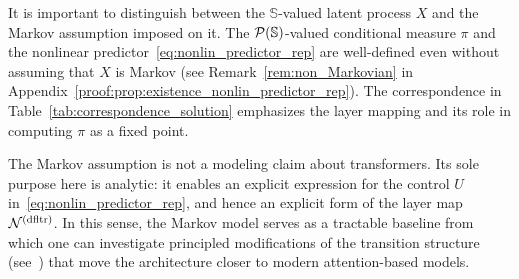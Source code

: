\documentclass[twoside,11pt]{article}
\def\clP{{\cal P}}
\def\bS{\begin{slide}}
\def\clP{{\cal P}}
\def\clP{{\cal P}}
\def\bS{\mathbb{S}}
\def\dfltr{{\text{\rm (dfltr)}}}
\begin{document}
It is important to distinguish between the $\bS$-valued latent
process $X$ and the Markov assumption imposed on it. The
$\clP(\bS)$-valued conditional measure $\pi$ and the nonlinear
predictor~\eqref{eq:nonlin_predictor_rep} are well-defined even
without assuming that $X$ is Markov (see
Remark~\ref{rem:non_Markovian} in
Appendix~\ref{proof:prop:existence_nonlin_predictor_rep}). The
correspondence in Table~\ref{tab:correspondence_solution} emphasizes
the layer mapping and its role in computing $\pi$ as a fixed point.


The Markov assumption is not a modeling claim about transformers. Its
sole purpose here is analytic: it enables an explicit expression for
the control $U$ in~\eqref{eq:nonlin_predictor_rep}, and hence an
explicit form of the layer map ${\cal N}^\dfltr$. In this sense, the
Markov model serves as a tractable baseline from which one can
investigate principled modifications of the transition structure
(see~\cite{alaa2019attentive,tang2021probabilistic}) that move the
architecture closer to modern attention-based models.




\end{document}
